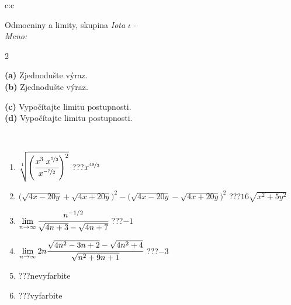 \documentclass[10pt]{report}
\begin{document}
\begin{tabular}{c:c}
\begin{minipage}[c][104.5mm][t]{0.5\linewidth}
\begin{center}
\vspace{7mm}
{\huge Odmocniny a limity, skupina \textit{Iota $\iota$} -}\\[5mm]
\textit{Meno:}\phantom{xxxxxxxxxxxxxxxxxxxxxxxxxxxxxxxxxxxxxxxxxxxxxxxxxxxxxxxxxxxxxxxxx}\\[5mm]
\begin{minipage}{0.95\linewidth}
\begin{center}
{\small \begin{multicols}{2} \raggedright
\textbf{(a)} Zjednodušte výraz. \\[1mm]
\textbf{(b)} Zjednodušte výraz. \par \columnbreak
\textbf{(c)} Vypočítajte limitu postupnosti. \\[1mm]
\textbf{(d)} Vypočítajte limitu postupnosti.
\end{multicols}
}
\end{center}
\end{minipage}
\\[4mm]
\begin{minipage}{0.79\linewidth}
\begin{center}
\begin{varwidth}{\linewidth}
\begin{enumerate}
\small
\item $\sqrt[1]{\left(\cfrac{x^{3}\;x^{\nicefrac{5}{3}}}{x^{\nicefrac{-7}{2}}}\right)^{2}}$\quad \dotfill\; ???\;\dotfill \quad $x^{\nicefrac{49}{3}}$
\item {\footnotesize{\scriptsize$\big(\sqrt{4x-20y}+\sqrt{4x+20y}\big)^2-\big(\sqrt{4x-20y}-\sqrt{4x+20y}\big)^2$}\quad \dotfill\; ???\;\dotfill \quad $16\sqrt{x^2+5y^2}$}
\item $\lim\limits_{n\to\infty}\cfrac{n^{-1/2}}{\sqrt{4n+3}-\sqrt{4n+7}}$\quad \dotfill\; ???\;\dotfill \quad $-1$
\item $\lim\limits_{n\to\infty}2n\cfrac{\sqrt{4n^2-3n+2}-\sqrt{4n^2+4}}{\sqrt{n^2+9n+1}}$\quad \dotfill\; ???\;\dotfill \quad $-3$
\item \quad \dotfill\; ???\;\dotfill \quad nevyfarbite
\item \quad \dotfill\; ???\;\dotfill \quad vyfarbite
\end{enumerate}
\end{varwidth}
\end{center}
\end{minipage}

\end{center}
\end{minipage}
\end{tabular}
\end{document}
